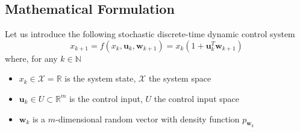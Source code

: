 \subsection{Mathematical Formulation}
 Let us introduce the following stochastic discrete-time dynamic control system
\begin{equation}
\label{eq:state_equation}
x_{k+1} = f(x_k,\bm{u}_k,\bm{w}_{k+1}) = x_k (1 + \bm{u}_k^T \bm{w}_{k+1}) 
\end{equation}
where, for any $k \in \mathbb{N}$
\begin{itemize}
	\item $x_k \in \mathcal{X} = \mathbb{R}$ is the system state, $\mathcal{X}$ the system space
	\item $\bm{u}_k \in U \subset \mathbb{R}^m$ is the control input, $U$ the control input space
	\item $\bm{w}_{k}$ is a $m$-dimensional random vector with density function $p_{\bm{w}_k}$
\end{itemize}

